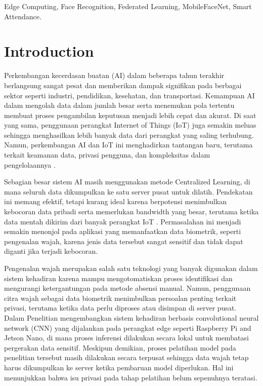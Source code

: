 \documentclass[conference]{IEEEtran}
\begin{document}
\begin{IEEEkeywords}
Edge Computing, Face Recognition, Federated Learning, MobileFaceNet, Smart Attendance.
\end{IEEEkeywords}

\section{Introduction}
Perkembangan kecerdasan buatan (AI) dalam beberapa tahun terakhir berlangsung sangat pesat dan memberikan dampak signifikan pada berbagai sektor seperti industri, pendidikan, kesehatan, dan transportasi. Kemampuan AI dalam mengolah data dalam jumlah besar serta menemukan pola tertentu membuat proses pengambilan keputusan menjadi lebih cepat dan akurat. Di saat yang sama, penggunaan perangkat Internet of Things (IoT) juga semakin meluas sehingga menghasilkan lebih banyak data dari perangkat yang saling terhubung. Namun, perkembangan AI dan IoT ini menghadirkan tantangan baru, terutama terkait keamanan data, privasi pengguna, dan kompleksitas dalam pengelolaannya \cite{b1}.

Sebagian besar sistem AI masih menggunakan metode Centralized Learning, di mana seluruh data dikumpulkan ke satu server pusat untuk dilatih. Pendekatan ini memang efektif, tetapi kurang ideal karena berpotensi menimbulkan kebocoran data pribadi serta memerlukan bandwidth yang besar, terutama ketika data mentah dikirim dari banyak perangkat IoT \cite{b2}. Permasalahan ini menjadi semakin menonjol pada aplikasi yang memanfaatkan data biometrik, seperti pengenalan wajah, karena jenis data tersebut sangat sensitif dan tidak dapat diganti jika terjadi kebocoran.

Pengenalan wajah merupakan salah satu teknologi yang banyak digunakan dalam sistem kehadiran karena mampu mengotomatiskan proses identifikasi dan mengurangi ketergantungan pada metode absensi manual. Namun, penggunaan citra wajah sebagai data biometrik menimbulkan persoalan penting terkait privasi, terutama ketika data perlu diproses atau disimpan di server pusat. Dalam Penelitian \cite{b3} mengembangkan sistem kehadiran berbasis convolutional neural network (CNN) yang dijalankan pada perangkat edge seperti Raspberry Pi and Jetson Nano, di mana proses inferensi dilakukan secara lokal untuk membatasi pergerakan data sensitif. Meskipun demikian, proses pelatihan model pada penelitian tersebut masih dilakukan secara terpusat sehingga data wajah tetap harus dikumpulkan ke server ketika pembaruan model diperlukan. Hal ini menunjukkan bahwa isu privasi pada tahap pelatihan belum sepenuhnya teratasi.
\end{document}
